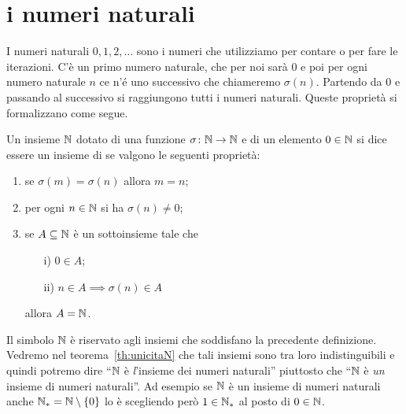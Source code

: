 \section{i numeri naturali}

I numeri naturali $0,1,2,\dots$ sono i numeri che utilizziamo per contare o per 
fare le iterazioni. C'è un primo numero naturale, che per noi sarà $0$ e poi
per ogni numero naturale $n$ ce n'é uno successivo che chiameremo $\sigma(n)$. 
Partendo da $0$ e passando al successivo si raggiungono tutti i numeri naturali.
Queste proprietà si formalizzano come segue. 

%    
\begin{definition}%
  \label{def:naturali}%
  \index{$\NN$}%
  Un insieme $\NN$ dotato di una 
  funzione $\sigma\colon{\mathbb N}\to{\mathbb N}$ e di un elemento $0\in {\mathbb N}$ 
  si dice essere un insieme di 
   se valgono le seguenti proprietà:
  \begin{enumerate}
  \item se $\sigma(m) =\sigma(n)$ allora $m=n$;
  \item per ogni $n\in {\mathbb N}$ si ha $\sigma(n)\neq 0$;
  \item se $A\subseteq {\mathbb N}$ è un sottoinsieme tale che 
  \begin{enumerate}
    \item[i)] $0\in A$;
    \item[ii)] $n\in A \implies \sigma(n)\in A$
  \end{enumerate}
  allora $A={\mathbb N}$.
\end{enumerate}
\end{definition}

Il simbolo $\NN$ è riservato agli insiemi che soddisfano la precedente definizione.
Vedremo nel teorema~\ref{th:unicitaN} che tali insiemi 
sono tra loro indistinguibili e quindi potremo dire 
``$\NN$ è \emph{l}'insieme dei numeri naturali''
piuttosto che ``$\NN$ è \emph{un} insieme di numeri naturali''.
Ad esempio se $\NN$ è un insieme di numeri naturali anche ${\mathbb N}_* = {\mathbb N}\setminus\{0\}$
lo è scegliendo però $1\in {\mathbb N}_*$ al posto di $0\in {\mathbb N}$.

